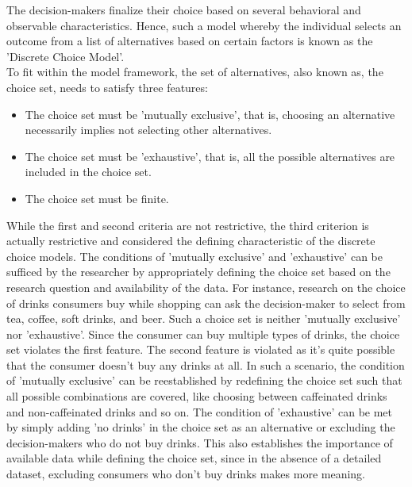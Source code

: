 \documentclass[a4paper,11pt]{article}
\begin{document}
    The decision-makers finalize their choice based on several behavioral and observable characteristics. Hence, such a model whereby the individual selects an outcome from a list of alternatives based on certain factors is known as the 'Discrete Choice Model'. \\

    To fit within the model framework, the set of alternatives, also known as, the choice set, needs to satisfy three features\cite{Train}:\\

    \begin{itemize}
        \item The choice set must be 'mutually exclusive', that is, choosing an alternative necessarily implies not selecting other alternatives. 
        \item The choice set must be 'exhaustive', that is, all the possible alternatives are included in the choice set.
        \item The choice set must be finite. \\
    \end{itemize}

    While the first and second criteria are not restrictive, the third criterion is actually restrictive and considered the defining characteristic of the discrete choice models. The conditions of 'mutually exclusive' and 'exhaustive' can be sufficed by the researcher by appropriately defining the choice set based on the research question and availability of the data. For instance, research on the choice of drinks consumers buy while shopping can ask the decision-maker to select from tea, coffee, soft drinks, and beer. Such a choice set is neither 'mutually exclusive' nor 'exhaustive'. Since the consumer can buy multiple types of drinks, the choice set violates the first feature. The second feature is violated as it's quite possible that the consumer doesn't buy any drinks at all. In such a scenario, the condition of 'mutually exclusive' can be reestablished by redefining the choice set such that all possible combinations are covered, like choosing between caffeinated drinks and non-caffeinated drinks and so on. The condition of 'exhaustive' can be met by simply adding 'no drinks' in the choice set as an alternative or excluding the decision-makers who do not buy drinks. This also establishes the importance of available data while defining the choice set, since in the absence of a detailed dataset, excluding consumers who don't buy drinks makes more meaning. \\
\end{document}
